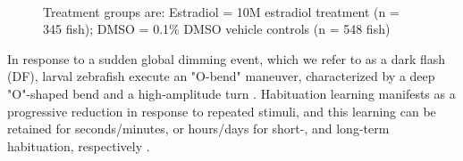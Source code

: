 \documentclass[9pt,lineno]{RandlettLab_elife}
\begin{document}
\begin{figure}
\begin{fullwidth}
\begin{center}
{\\ Treatment groups are: Estradiol = 10\textmu M estradiol treatment (n = 345 fish); DMSO = 0.1\% DMSO vehicle controls (n = 548 fish)
}

\label{fig:1}

\end{center}
\end{fullwidth}
\end{figure}

In response to a sudden global dimming event, which we refer to as a dark flash (DF), larval zebrafish execute an "O-bend" maneuver, characterized by a deep "O"-shaped bend and a high-amplitude turn \citep{Burgess2007}. 
Habituation learning manifests as a progressive reduction in response to repeated stimuli, and this learning can be retained for seconds/minutes, or hours/days for short-, and long-term habituation, respectively \citep{Rankin2009-no}. 
\end{document}
